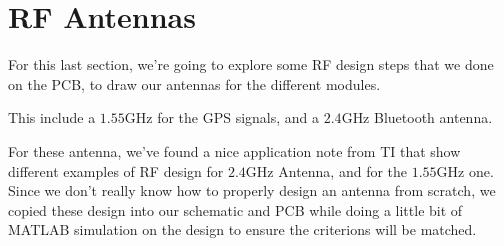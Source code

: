 \section{RF Antennas}
For this last section, we're going to explore some RF design steps that we done
on the PCB, to draw our antennas for the different modules.

This include a $1.55 \si{\giga\hertz}$ for the GPS signals, and a $2.4
    \si{\giga\hertz}$ Bluetooth antenna.

For these antenna, we've found a nice application note from TI \cite{InvertedF}
that show different examples of RF design for $2.4 \si{\giga\hertz}$ Antenna,
and \cite{GNSS} for the $1.55 \si{\giga\hertz}$ one. Since we don't really know
how to properly design an antenna from scratch, we copied these design into our
schematic and PCB while doing a little bit of MATLAB simulation on the design
to ensure the criterions will be matched.